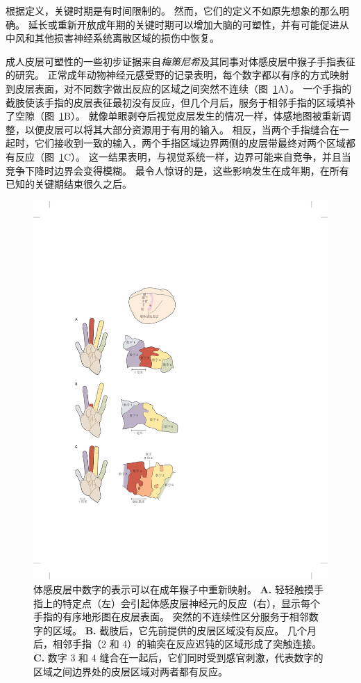 根据定义，关键时期是有时间限制的。
然而，它们的定义不如原先想象的那么明确。
延长或重新开放成年期的关键时期可以增加大脑的可塑性，并有可能促进从中风和其他损害神经系统离散区域的损伤中恢复。


成人皮层可塑性的一些初步证据来自\textit{梅策尼希}及其同事对体感皮层中猴子手指表征的研究。
正常成年动物神经元感受野的记录表明，每个数字都以有序的方式映射到皮层表面，对不同数字做出反应的区域之间突然不连续（图~\ref{fig:49_19}A）。
一个手指的截肢使该手指的皮层表征最初没有反应，但几个月后，服务于相邻手指的区域填补了空隙（图~\ref{fig:49_19}B）。
就像单眼剥夺后视觉皮层发生的情况一样，体感地图被重新调整，以便皮层可以将其大部分资源用于有用的输入。 相反，当两个手指缝合在一起时，它们接收到一致的输入，两个手指区域边界两侧的皮层带最终对两个区域都有反应（图~\ref{fig:49_19}C）。
这一结果表明，与视觉系统一样，边界可能来自竞争，并且当竞争下降时边界会变得模糊。
最令人惊讶的是，这些影响发生在成年期，在所有已知的关键期结束很久之后。


\begin{figure}[htbp]
	\centering
	\includegraphics[width=0.68\linewidth]{chap49/fig_49_19}
	\caption{体感皮层中数字的表示可以在成年猴子中重新映射\cite{merzenich1984somatosensory}。
		\textbf{A.} 轻轻触摸手指上的特定点（左）会引起体感皮层神经元的反应（右），显示每个手指的有序地形图在皮层表面。
		突然的不连续性区分服务于相邻数字的区域。
		\textbf{B.} 截肢后，它先前提供的皮层区域没有反应。
		几个月后，相邻手指（2 和 4）的轴突在反应迟钝的区域形成了突触连接。
		\textbf{C.} 数字 3 和 4 缝合在一起后，它们同时受到感官刺激，代表数字的区域之间边界处的皮层区域对两者都有反应。}
	\label{fig:49_19}
\end{figure}


